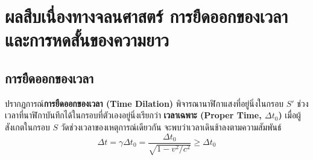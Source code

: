 \section[ผลสืบเนื่องทางจลนศาสตร์ การยืดออกของเวลาและการหดสั้นของความยาว]{ผลสืบเนื่องทางจลนศาสตร์ การยืดออกของเวลา\\และการหดสั้นของความยาว}

\subsection{การยืดออกของเวลา}
ปรากฏการณ์\textbf{การยืดออกของเวลา (Time Dilation)} พิจารณานาฬิกาแสงที่อยู่นิ่งในกรอบ $S'$ ช่วงเวลาที่นาฬิกาบันทึกได้ในกรอบที่ตัวเองอยู่นิ่งเรียกว่า \textbf{เวลาเฉพาะ (Proper Time, $\Delta t_0$)} เมื่อผู้สังเกตในกรอบ $S$ วัดช่วงเวลาของเหตุการณ์เดียวกัน จะพบว่าเวลาเดินช้าลงตามความสัมพันธ์
\begin{equation}
\Delta t = \gamma \Delta t_0 = \frac{\Delta t_0}{\sqrt{1 - v^2/c^2}} \ge \Delta t_0
\end{equation}

